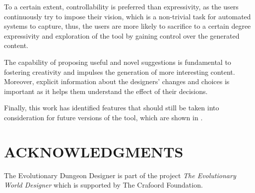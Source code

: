 \documentclass[sigconf]{acmart}
\begin{document}
To a certain extent, controllability is preferred than expressivity, as the users continuously try to impose their vision, which is a non-trivial task for automated systems to capture, thus, the users are more likely to sacrifice to a certain degree expressivity and exploration of the tool by gaining control over the generated content. 

The capability of proposing useful and novel suggestions is fundamental to fostering creativity and impulses the generation of more interesting content. Moreover, explicit information about the designers’ changes and choices is important as it helps them understand the effect of their decisions. 

Finally, this work has identified features that should still be taken into consideration for future versions of the tool, which are shown in .

\section*{ACKNOWLEDGMENTS}
The Evolutionary Dungeon Designer is part of the project \textit{The Evolutionary World Designer} which is supported by The Crafoord Foundation.



\end{document}
